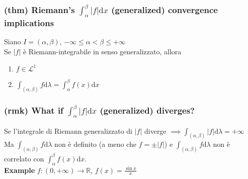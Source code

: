 \subsubsection{(thm) Riemann's $\int_\alpha^\beta|f|\mathrm dx$ (generalized) convergence implications}
Siano $I=(\alpha, \beta)$, $-\infty\leq \alpha <\beta \leq +\infty$\\
Se $|f|$ è Riemann-integrabile in senso generalizzato, allora
\begin{enumerate}
    \item $f \in \mathcal L^1$
    \item $\int_{(\alpha, \beta)} f\mathrm d\lambda = \int_\alpha^\beta f(x)\mathrm dx$
\end{enumerate}
\subsubsection{(rmk) What if $\int_\alpha^\beta|f|\mathrm dx$ (generalized) diverges?}
Se l'integrale di Riemann generalizzato di $|f|$ diverge $\implies \int_{(\alpha,\beta)}|f|\mathrm d\lambda =+\infty$\\
Ma $\int_{(\alpha,\beta)} f\mathrm d\lambda$ non è definito (a meno che $f = \pm |f|$) e $\int_{(\alpha,\beta)} f\mathrm d\lambda $ non è correlato con $\int_\alpha^\beta f(x)\mathrm dx$.\\
\textbf{Example} $f:(0,+\infty)\to \mathbb R$, $f(x)=\frac{\sin x}x$
